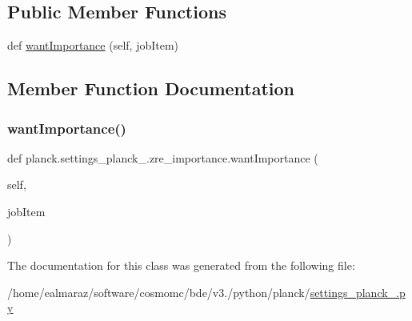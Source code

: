 \subsection*{Public Member Functions}
\begin{DoxyCompactItemize}
\item 
def \mbox{\hyperlink{classplanck_1_1settings__planck__2015_1_1zre__importance_a43e83e3ae075ddb06760d82a72a97a4d}{want\+Importance}} (self, job\+Item)
\end{DoxyCompactItemize}


\subsection{Member Function Documentation}
\mbox{\label{classplanck_1_1settings__planck__2015_1_1zre__importance_a43e83e3ae075ddb06760d82a72a97a4d}} 
\subsubsection{\texorpdfstring{want\+Importance()}{wantImportance()}}
{\footnotesize\ttfamily def planck.\+settings\+\_\+planck\+\_.\+zre\+\_\+importance.\+want\+Importance (\begin{DoxyParamCaption}\item[{}]{self,  }\item[{}]{job\+Item }\end{DoxyParamCaption})}



The documentation for this class was generated from the following file\+:\begin{DoxyCompactItemize}
\item 
/home/ealmaraz/software/cosmomc/bde/v3./python/planck/\mbox{\hyperlink{settings__planck__2015_8py}{settings\+\_\+planck\+\_.\+py}}\end{DoxyCompactItemize}
